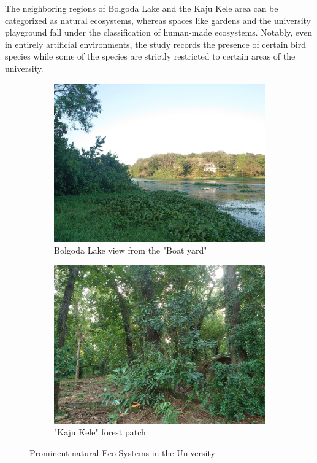 The neighboring regions of Bolgoda Lake and the Kaju Kele area can be categorized as natural ecosystems, whereas spaces like gardens and the university playground fall under the classification of human-made ecosystems. Notably, even in entirely artificial environments, the study records the presence of certain bird species while some of the species are strictly restricted to certain areas of the university.

\begin{figure}[!htpb]
    \centering
    \begin{subfigure}{0.45\textwidth}
        \includegraphics[width=\textwidth]{Figures/bolgoda.jpg}
        \caption{Bolgoda Lake view from the "Boat yard"}
        \label{fig:figure-02.1}
    \end{subfigure}
    \hspace{.5cm} %
    \begin{subfigure}{0.45\textwidth}
        \includegraphics[width=\textwidth]{Figures/kajuKele.jpg}
        \caption{"Kaju Kele" forest patch}
        \label{fig:figure-02.2}
    \end{subfigure}
    \caption{Prominent natural Eco Systems in the University}
    \label{fig:figure-02}
\end{figure}